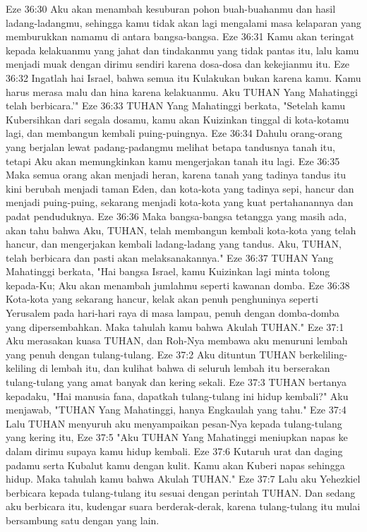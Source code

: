 Eze 36:30  Aku akan menambah kesuburan pohon buah-buahanmu dan hasil ladang-ladangmu, sehingga kamu tidak akan lagi mengalami masa kelaparan yang memburukkan namamu di antara bangsa-bangsa.
Eze 36:31  Kamu akan teringat kepada kelakuanmu yang jahat dan tindakanmu yang tidak pantas itu, lalu kamu menjadi muak dengan dirimu sendiri karena dosa-dosa dan kekejianmu itu.
Eze 36:32  Ingatlah hai Israel, bahwa semua itu Kulakukan bukan karena kamu. Kamu harus merasa malu dan hina karena kelakuanmu. Aku TUHAN Yang Mahatinggi telah berbicara.'"
Eze 36:33  TUHAN Yang Mahatinggi berkata, "Setelah kamu Kubersihkan dari segala dosamu, kamu akan Kuizinkan tinggal di kota-kotamu lagi, dan membangun kembali puing-puingnya.
Eze 36:34  Dahulu orang-orang yang berjalan lewat padang-padangmu melihat betapa tandusnya tanah itu, tetapi Aku akan memungkinkan kamu mengerjakan tanah itu lagi.
Eze 36:35  Maka semua orang akan menjadi heran, karena tanah yang tadinya tandus itu kini berubah menjadi taman Eden, dan kota-kota yang tadinya sepi, hancur dan menjadi puing-puing, sekarang menjadi kota-kota yang kuat pertahanannya dan padat penduduknya.
Eze 36:36  Maka bangsa-bangsa tetangga yang masih ada, akan tahu bahwa Aku, TUHAN, telah membangun kembali kota-kota yang telah hancur, dan mengerjakan kembali ladang-ladang yang tandus. Aku, TUHAN, telah berbicara dan pasti akan melaksanakannya."
Eze 36:37  TUHAN Yang Mahatinggi berkata, "Hai bangsa Israel, kamu Kuizinkan lagi minta tolong kepada-Ku; Aku akan menambah jumlahmu seperti kawanan domba.
Eze 36:38  Kota-kota yang sekarang hancur, kelak akan penuh penghuninya seperti Yerusalem pada hari-hari raya di masa lampau, penuh dengan domba-domba yang dipersembahkan. Maka tahulah kamu bahwa Akulah TUHAN."
Eze 37:1  Aku merasakan kuasa TUHAN, dan Roh-Nya membawa aku menuruni lembah yang penuh dengan tulang-tulang.
Eze 37:2  Aku dituntun TUHAN berkeliling-keliling di lembah itu, dan kulihat bahwa di seluruh lembah itu berserakan tulang-tulang yang amat banyak dan kering sekali.
Eze 37:3  TUHAN bertanya kepadaku, "Hai manusia fana, dapatkah tulang-tulang ini hidup kembali?" Aku menjawab, "TUHAN Yang Mahatinggi, hanya Engkaulah yang tahu."
Eze 37:4  Lalu TUHAN menyuruh aku menyampaikan pesan-Nya kepada tulang-tulang yang kering itu,
Eze 37:5  "Aku TUHAN Yang Mahatinggi meniupkan napas ke dalam dirimu supaya kamu hidup kembali.
Eze 37:6  Kutaruh urat dan daging padamu serta Kubalut kamu dengan kulit. Kamu akan Kuberi napas sehingga hidup. Maka tahulah kamu bahwa Akulah TUHAN."
Eze 37:7  Lalu aku Yehezkiel berbicara kepada tulang-tulang itu sesuai dengan perintah TUHAN. Dan sedang aku berbicara itu, kudengar suara berderak-derak, karena tulang-tulang itu mulai bersambung satu dengan yang lain.
